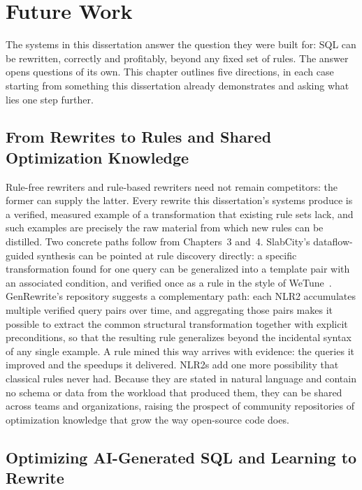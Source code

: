 \chapter{Future Work}
\label{chap:future}

The systems in this dissertation answer the question they were built
for: SQL can be rewritten, correctly and profitably, beyond any fixed
set of rules. The answer opens questions of its own. This chapter
outlines five directions, in each case starting from something this
dissertation already demonstrates and asking what lies one step
further.

\section{From Rewrites to Rules and Shared Optimization Knowledge}
\label{sec:fw:rules}

Rule-free rewriters and rule-based rewriters need not remain
competitors: the former can supply the latter. Every rewrite this
dissertation's systems produce is a verified, measured example of a
transformation that existing rule sets lack, and such examples are
precisely the raw material from which new rules can be distilled. Two
concrete paths follow from Chapters~3 and~4. SlabCity's
dataflow-guided synthesis can be pointed at rule discovery directly:
a specific transformation found for one query can be generalized into
a template pair with an associated condition, and verified once as a
rule in the style of WeTune~\cite{wetune}. GenRewrite's repository
suggests a complementary path: each NLR2 accumulates multiple
verified query pairs over time, and aggregating those pairs makes it
possible to extract the common structural transformation together
with explicit preconditions, so that the resulting rule generalizes
beyond the incidental syntax of any single example. A rule mined this
way arrives with evidence: the queries it improved and the speedups
it delivered. NLR2s add one more possibility that classical rules
never had. Because they are stated in natural language and contain no
schema or data from the workload that produced them, they can be
shared across teams and organizations, raising the prospect of
community repositories of optimization knowledge that grow the way
open-source code does.

\section{Optimizing AI-Generated SQL and Learning to Rewrite}
\label{sec:fw:ai-sql}

